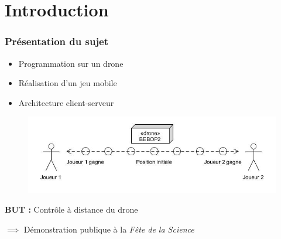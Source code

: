 \section{Introduction}
\begin{frame}
\frametitle{Présentation du sujet}
\begin{center}
\begin{itemize}
\item Programmation sur un drone
\item Réalisation d'un jeu mobile
\item Architecture client-serveur
\end{itemize}
\begin{figure}
\includegraphics[scale=0.4]{images/partie.jpg}
\end{figure}
\end{center}

\textbf{BUT :} Contrôle à distance du drone

$\implies$ Démonstration publique à la \textit{Fête de la Science}
\end{frame}

